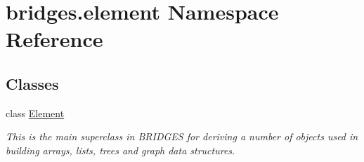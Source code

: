 \hypertarget{namespacebridges_1_1element}{}\section{bridges.\+element Namespace Reference}
\label{namespacebridges_1_1element}
\subsection*{Classes}
\begin{DoxyCompactItemize}
\item 
class \hyperlink{classbridges_1_1element_1_1_element}{Element}
\begin{DoxyCompactList}\small\item\em This is the main superclass in B\+R\+I\+D\+G\+E\+S for deriving a number of objects used in building arrays, lists, trees and graph data structures. \end{DoxyCompactList}\end{DoxyCompactItemize}
